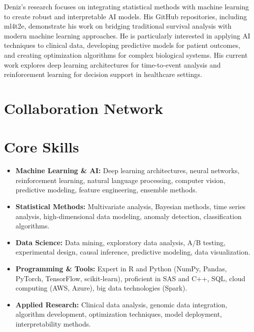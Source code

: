 \documentclass[11pt,a4paper,]{moderncv}
\providecommand{\tightlist}{%
	\setlength{\itemsep}{0pt}\setlength{\parskip}{0pt}}
\begin{document}
Deniz's research focuses on integrating statistical methods with machine
learning to create robust and interpretable AI models. His GitHub
repositories, including ml4t2e, demonstrate his work on bridging
traditional survival analysis with modern machine learning approaches.
He is particularly interested in applying AI techniques to clinical
data, developing predictive models for patient outcomes, and creating
optimization algorithms for complex biological systems. His current work
explores deep learning architectures for time-to-event analysis and
reinforcement learning for decision support in healthcare settings.

\section{Collaboration Network}\label{collaboration-network}


\section{Core Skills}\label{core-skills}

\begin{itemize}
\tightlist
\item
  \textbf{Machine Learning \& AI:} Deep learning architectures, neural
  networks, reinforcement learning, natural language processing,
  computer vision, predictive modeling, feature engineering, ensemble
  methods.
\item
  \textbf{Statistical Methods:} Multivariate analysis, Bayesian methods,
  time series analysis, high-dimensional data modeling, anomaly
  detection, classification algorithms.
\item
  \textbf{Data Science:} Data mining, exploratory data analysis, A/B
  testing, experimental design, causal inference, predictive modeling,
  data visualization.
\item
  \textbf{Programming \& Tools:} Expert in R and Python (NumPy, Pandas,
  PyTorch, TensorFlow, scikit-learn), proficient in SAS and C++, SQL,
  cloud computing (AWS, Azure), big data technologies (Spark).
\item
  \textbf{Applied Research:} Clinical data analysis, genomic data
  integration, algorithm development, optimization techniques, model
  deployment, interpretability methods.
\end{itemize}
\end{document}
